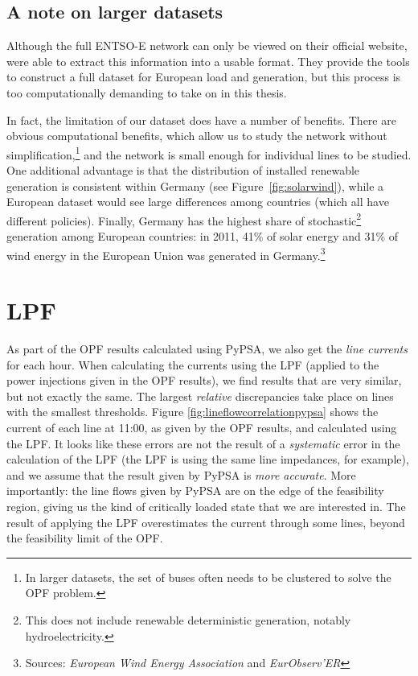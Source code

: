 \documentclass[main.tex]{subfiles}
\begin{document}
\subsection{A note on larger datasets}
Although the full ENTSO-E network can only be viewed on their official website, \cite{PyPSAEUR} were able to extract this information into a usable format. They provide the tools to construct a full dataset for European load and generation, but this process is too computationally demanding to take on in this thesis. 

In fact, the limitation of our dataset does have a number of benefits. There are obvious computational benefits, which allow us to study the network without simplification,\footnote{In larger datasets, the set of buses often needs to be clustered to solve the OPF problem.} and the network is small enough for individual lines to be studied. One additional advantage is that the distribution of installed renewable generation is consistent within Germany (see Figure~\ref{fig:solarwind}), while a European dataset would see large differences among countries (which all have different policies). Finally, Germany has the highest share of stochastic\footnote{This does not include renewable deterministic generation, notably hydroelectricity.} generation among European countries: in 2011, 41\% of solar energy and 31\% of wind energy in the European Union was generated in Germany.\footnote{Sources: \emph{European Wind Energy Association} and \emph{EurObserv’ER}}

\section{LPF}
As part of the OPF results calculated using PyPSA, we also get the \emph{line currents} for each hour. When calculating the currents using the LPF (applied to the power injections given in the OPF results), we find results that are very similar, but not exactly the same. The largest \emph{relative} discrepancies take place on lines with the smallest thresholds. Figure \ref{fig:lineflowcorrelationpypsa} shows the current of each line at 11:00, as given by the OPF results, and calculated using the LPF. It looks like these errors are not the result of a \textit{systematic} error in the calculation of the LPF (the LPF is using the same line impedances, for example), and we assume that the result given by PyPSA is \emph{more accurate}. More importantly: the line flows given by PyPSA are on the edge of the feasibility region, giving us the kind of critically loaded state that we are interested in. The result of applying the LPF overestimates the current through some lines, beyond the feasibility limit of the OPF.
\end{document}
